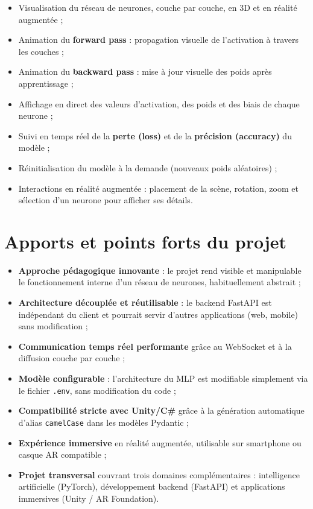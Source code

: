 \documentclass[12pt,a4paper]{report}
\begin{document}
\begin{itemize}
    \item Visualisation du r\'eseau de neurones, couche par couche, en 3D et
    en r\'ealit\'e augment\'ee ;
    \item Animation du \textbf{forward pass} : propagation visuelle de
    l'activation \`a travers les couches ;
    \item Animation du \textbf{backward pass} : mise \`a jour visuelle des
    poids apr\`es apprentissage ;
    \item Affichage en direct des valeurs d'activation, des poids et des
    biais de chaque neurone ;
    \item Suivi en temps r\'eel de la \textbf{perte (loss)} et de la
    \textbf{pr\'ecision (accuracy)} du mod\`ele ;
    \item R\'einitialisation du mod\`ele \`a la demande (nouveaux poids
    al\'eatoires) ;
    \item Interactions en r\'ealit\'e augment\'ee : placement de la sc\`ene,
    rotation, zoom et s\'election d'un neurone pour afficher ses d\'etails.
\end{itemize}

\section{Apports et points forts du projet}

\begin{itemize}
    \item \textbf{Approche p\'edagogique innovante} : le projet rend visible
    et manipulable le fonctionnement interne d'un r\'eseau de neurones,
    habituellement abstrait ;
    \item \textbf{Architecture d\'ecoupl\'ee et r\'eutilisable} : le backend
    FastAPI est ind\'ependant du client et pourrait servir d'autres
    applications (web, mobile) sans modification ;
    \item \textbf{Communication temps r\'eel performante} gr\^ace au
    WebSocket et \`a la diffusion couche par couche ;
    \item \textbf{Mod\`ele configurable} : l'architecture du MLP est
    modifiable simplement via le fichier \texttt{.env}, sans modification du
    code ;
    \item \textbf{Compatibilit\'e stricte avec Unity/C\#} gr\^ace \`a la
    g\'en\'eration automatique d'alias \texttt{camelCase} dans les mod\`eles
    Pydantic ;
    \item \textbf{Exp\'erience immersive} en r\'ealit\'e augment\'ee,
    utilisable sur smartphone ou casque AR compatible ;
    \item \textbf{Projet transversal} couvrant trois domaines compl\'ementaires :
    intelligence artificielle (PyTorch), d\'eveloppement backend (FastAPI) et
    applications immersives (Unity / AR Foundation).
\end{itemize}
\end{document}

